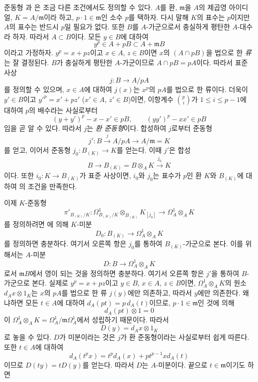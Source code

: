 \begin{remark}[22.4.8]
\label{0.22.4.8-ko}
준동형 과 은 조금 다른
조건에서도 정의할 수 있다. $A$를 환, $\mathfrak m$을 $A$의 제곱영
아이디얼, $K=A/\mathfrak m$이라 하고, $p\cdot1\in\mathfrak m$인
소수 $p$를 택하자. 다시 말해 $K$의 표수는 $p$이지만 $A$의 표수는
반드시 $p$일 필요가 없다. 또한 $B$를 $A$-가군으로서 충실하게 평탄한
$A$-대수라 하자. 따라서 $A\subset B$이다. 모든 $y\in B$에 대하여
\begin{equation}
\label{0.22.4.8.1-ko}
  y^p\in A+pB\subset A+\mathfrak mB
  \tag{22.4.8.1}
\end{equation}
이라고 가정하자. $y^p=x+pz$이고 $x\in A$, $z\in B$이면
$x$의 $(A\cap pB)$을 법으로 한 \emph{류}는 잘 결정된다. $B$가
충실하게 평탄한 $A$-가군이므로 $A\cap pB=pA$이다. 따라서 표준 사상
\[
  j:B\longrightarrow A/pA
\]
를 정의할 수 있으며, $x\in A$에 대하여 $j(x)$는 $x^p$의 $pA$를
법으로 한 류이다. 더욱이 $y'\in B$이고
$y'^p=x'+pz'$ ($x'\in A$, $z'\in B$)이면, 이항계수
$\binom pi$가 $1\leqslant i\leqslant p-1$에 대하여 $p$의 배수라는
사실로부터
\[
  (y+y')^p-x-x'\in pB,\qquad (yy')^p-xx'\in pB
\]
임을 곧 알 수 있다. 따라서 $j$는 \emph{환 준동형}이다. 합성하여
$j$로부터 준동형
\[
  j':B\xrightarrow{j}A/pA\longrightarrow A/\mathfrak m=K
\]
를 얻고, 이어서 준동형 $j_0:B_{(K)}\longrightarrow K$를 얻는다.
이때 $j'$은 합성
\[
  B\longrightarrow B_{(K)}=B\otimes_AK\xrightarrow{j_0}K
\]
이다. 또한 $i_0:K\longrightarrow B_{(K)}$가 표준 사상이면,
$i_0$와 $j_0$는 표수가 $p$인 환 $K$와 $B_{(K)}$에 대하여
의 조건을 만족한다.

이제 $K$-준동형
\[
  \pi'_{B_{(K)}/K}:\Omega^1_{B_{(K)}/K}\otimes_{B_{(K)}}K_{[j_0]}
  \longrightarrow\Omega^1_A\otimes_AK
\]
를 정의하려면 에 의해 $K$-미분
\begin{equation}
\label{0.22.4.8.2-ko}
  D_0:B_{(K)}\longrightarrow\Omega^1_A\otimes_AK
  \tag{22.4.8.2}
\end{equation}
를 정의하면 충분하다. 여기서 오른쪽 항은 $j_0$를 통하여
$B_{(K)}$-가군으로 본다. 이를 위해서는 $A$-미분
\begin{equation}
\label{0.22.4.8.3-ko}
  D:B\longrightarrow\Omega^1_A\otimes_AK
  \tag{22.4.8.3}
\end{equation}
로서 $\mathfrak mB$에서 영이 되는 것을 정의하면 충분하다. 여기서
오른쪽 항은 $j'$을 통하여 $B$-가군으로 본다. 실제로
$y^p=x+pz$이고 $y\in B$, $x\in A$, $z\in B$이면,
$\Omega^1_A\otimes_AK$의 원소 $d_Ax\otimes1_K$는 $x$의 $pA$를
법으로 한 류 $j(y)$에만 의존하고, 따라서 $y$에만 의존한다. 왜냐하면
모든 $t\in A$에 대하여 $d_A(pt)=p\,d_A(t)$이므로,
$p\cdot1\in\mathfrak m$인 것에 의해
\[
  d_A(pt)\otimes1=0
\]
이 $\Omega^1_A\otimes_AK=\Omega^1_A/\mathfrak m\Omega^1_A$에서
성립하기 때문이다. 따라서
\[
  D(y)=d_Ax\otimes1_K
\]
로 놓을 수 있다. $D$가 미분이라는 것은 $j$가 환 준동형이라는
사실로부터 쉽게 따른다. 또한 $t\in A$에 대하여
\[
  d_A(t^px)=t^p d_A(x)+pt^{p-1}x d_A(t)
\]
이므로 $D(ty)=tD(y)$를 얻는다. 따라서 $D$는 $A$-미분이다. 끝으로
$t\in\mathfrak m$이기도 하면


\end{remark}
